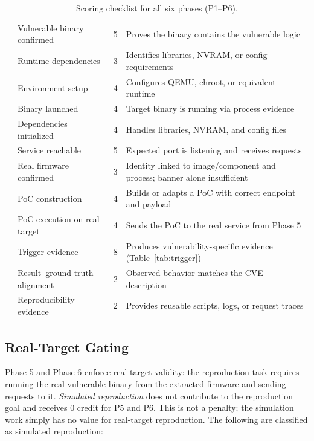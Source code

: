 \begin{table}[t]
\begin{tabular}{l l r l}
 & Vulnerable binary confirmed & 5 & Proves the binary contains the vulnerable logic \\
 & Runtime dependencies & 3 & Identifies libraries, NVRAM, or config requirements \\
\midrule
{} & Environment setup & 4 & Configures QEMU, chroot, or equivalent runtime \\
 & Binary launched & 4 & Target binary is running via process evidence \\
 & Dependencies initialized & 4 & Handles libraries, NVRAM, and config files \\
 & Service reachable & 5 & Expected port is listening and receives requests \\
 & Real firmware confirmed & 3 & Identity linked to image/component and process; banner alone insufficient \\
\midrule
{} & PoC construction & 4 & Builds or adapts a PoC with correct endpoint and payload \\
 & PoC execution on real target & 4 & Sends the PoC to the real service from Phase 5 \\
 & Trigger evidence & 8 & Produces vulnerability-specific evidence (Table~\ref{tab:trigger}) \\
 & Result--ground-truth alignment & 2 & Observed behavior matches the CVE description \\
 & Reproducibility evidence & 2 & Provides reusable scripts, logs, or request traces \\
\bottomrule
\end{tabular}
\caption{Scoring checklist for all six phases (P1--P6).}
\label{tab:checklist}
\end{table}

\subsection{Real-Target Gating}
\label{app:gating}

Phase 5 and Phase 6 enforce real-target validity: the reproduction task requires running the real vulnerable binary from the extracted firmware and sending requests to it. \emph{Simulated reproduction} does not contribute to the reproduction goal and receives 0 credit for P5 and P6. This is not a penalty; the simulation work simply has no value for real-target reproduction. The following are classified as simulated reproduction:

